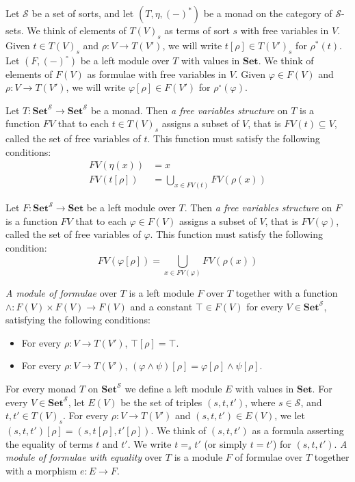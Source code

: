 \documentclass[reqno]{amsart}
\theoremstyle{definition}
\theoremstyle{remark}
\newcommand{\cat}[1]{\mathbf{#1}}
\newcommand{\Set}{\cat{Set}}
\numberwithin{figure}{section}
\begin{document}
Let $\mathcal{S}$ be a set of sorts, and let $(T,\eta,(-)^*)$ be a monad on the category of $\mathcal{S}$-sets.
We think of elements of $T(V)_s$ as terms of sort $s$ with free variables in $V$.
Given $t \in T(V)_s$ and $\rho : V \to T(V')$, we will write $t[\rho] \in T(V')_s$ for $\rho^*(t)$.
Let $(F,(-)^\circ)$ be a left module over $T$ with values in $\Set$.
We think of elements of $F(V)$ as formulae with free variables in $V$.
Given $\varphi \in F(V)$ and $\rho : V \to T(V')$, we will write $\varphi[\rho] \in F(V')$ for $\rho^\circ(\varphi)$.

Let $T : \Set^\mathcal{S} \to \Set^\mathcal{S}$ be a monad.
Then \emph{a free variables structure} on $T$ is a function $FV$ that to each $t \in T(V)_s$ assigns a subset of $V$, that is $FV(t) \subseteq V$, called the set of free variables of $t$.
This function must satisfy the following conditions:
\begin{align*}
FV(\eta(x)) & = x \\
FV(t[\rho]) & = \bigcup_{x \in FV(t)} FV(\rho(x))
\end{align*}

Let $F : \Set^\mathcal{S} \to \Set$ be a left module over $T$.
Then \emph{a free variables structure} on $F$ is a function $FV$ that to each $\varphi \in F(V)$ assigns a subset of $V$, that is $FV(\varphi)$, called the set of free variables of $\varphi$.
This function must satisfy the following condition:
\[ FV(\varphi[\rho]) = \bigcup_{x \in FV(\varphi)} FV(\rho(x)) \]

\emph{A module of formulae} over $T$ is a left module $F$ over $T$ together with a function
    $\land : F(V) \times F(V) \to F(V)$ and a constant $\top \in F(V)$ for every $V \in \Set^\mathcal{S}$, satisfying the following conditions:
\begin{itemize}
\item For every $\rho : V \to T(V')$, $\top[\rho] = \top$.
\item For every $\rho : V \to T(V')$, $(\varphi \land \psi)[\rho] = \varphi[\rho] \land \psi[\rho]$.
\end{itemize}

For every monad $T$ on $\Set^\mathcal{S}$ we define a left module $E$ with values in $\Set$.
For every $V \in \Set^\mathcal{S}$, let $E(V)$ be the set of triples $(s,t,t')$, where $s \in \mathcal{S}$, and $t,t' \in T(V)_s$.
For every $\rho : V \to T(V')$ and $(s,t,t') \in E(V)$, we let $(s,t,t')[\rho] = (s,t[\rho],t'[\rho])$.
We think of $(s,t,t')$ as a formula asserting the equality of terms $t$ and $t'$.
We write $t =_s t'$ (or simply $t = t'$) for $(s,t,t')$.
\emph{A module of formulae with equality} over $T$ is a module $F$ of formulae over $T$ together with a morphism $e : E \to F$.
\end{document}
